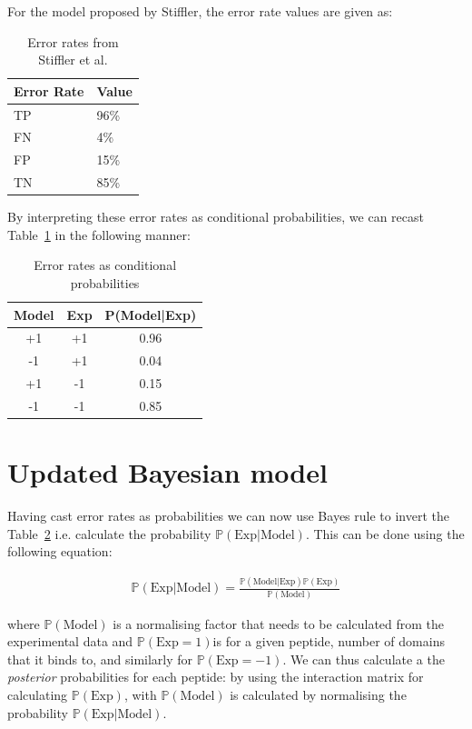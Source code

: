 \documentclass[a4paper, 12pt]{article}
\begin{document}
	For the model proposed by Stiffler, the error rate values are given as:

\begin{table}[!h]
\centering
\caption{Error rates from Stiffler et al.}
\label{tab_error_rate}
\begin{tabular}{@{}ll@{}}
\toprule
Error Rate & Value \\ \midrule
TP         & 96\%  \\
FN         & 4\%   \\
FP         & 15\%  \\
TN         & 85\%  \\ \bottomrule
\end{tabular}
\end{table}

By interpreting these error rates as conditional probabilities, we can recast Table~\ref{tab_error_rate} in the following manner:

\begin{table}[!h]
\centering
\caption{Error rates as conditional probabilities}
\label{tab_proba_error}
\begin{tabular}{@{}ccc@{}}
\toprule
Model & Exp & P(Model|Exp) \\ \midrule
+1    & +1  & 0.96         \\
-1    & +1  & 0.04         \\
+1    & -1  & 0.15         \\
-1    & -1  & 0.85         \\ \bottomrule
\end{tabular}
\end{table}

\section{Updated Bayesian model}

Having cast error rates as probabilities we can now use Bayes rule to invert the Table~\ref{tab_proba_error} i.e. calculate the probability $\mathbb{P}(\text{Exp|Model})$. This can be done using the following equation:

\begin{align}
\label{invert_proba_bayes}
\mathbb{P}(\text{Exp|Model}) = \frac{\mathbb{P}(\text{Model|Exp}) \mathbb{P}(\text{Exp})}{\mathbb{P}(\text{Model})}
\end{align}

where $\mathbb{P}(\text{Model})$ is a normalising factor that needs to be calculated from the experimental data and $\mathbb{P}(\text{Exp}=1)$is for a given peptide, number of domains that it binds to, and similarly for $\mathbb{P}(\text{Exp}=-1)$. We can thus calculate a the \textit{posterior} probabilities for each peptide: by using the interaction matrix for calculating $\mathbb{P}(\text{Exp})$, with $\mathbb{P}(\text{Model})$ is calculated by normalising the probability $\mathbb{P}(\text{Exp|Model})$. 
\end{document}
